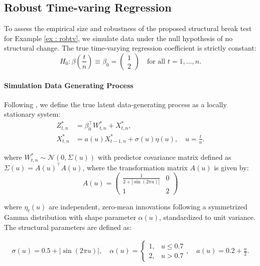 \documentclass[12pt,a4paper]{article}
\theoremstyle{definition}
\theoremstyle{definition}
\theoremstyle{theorem}
\begin{document}
\subsection{Robust Time-varing Regression}

To assess the empirical size and robustness of the proposed structural break test for Example \ref{ex : robtv}, we simulate data under the null hypothesis of no structural change. The true time-varying regression coefficient is strictly constant:
\begin{equation*}
    H_0: \beta\left(\frac{t}{n}\right) \equiv \beta_0 = \begin{pmatrix} 1 \\ 2 \end{pmatrix} \quad \text{for all } t = 1, \dots, n.
\end{equation*}

\paragraph{Simulation Data Generating Process}
Following \cite{Mies2023}, we define the true latent  data-generating process as a locally stationary system:
\begin{align}
    Z_{t,n}^* &= \beta_0^\top W_{t,n}^* + X_{t,n}^*, \\
    X_{t,n}^* &= a(u)X_{t-1,n}^* + \sigma(u) \eta(u),\quad u = \frac{t}{n}.\label{eq : AR(1)}
\end{align}


where $W_{t,n}^* \sim \mathcal{N}(0, \Sigma(u))$ with predictor covariance matrix defined as $\Sigma(u) = A(u)^\top A(u)$, where the transformation matrix $A(u)$ is given by:
\begin{equation*}
    A(u) = \begin{pmatrix} \frac{1}{2+|\sin(2\pi u)|} & 0 \\ 1 & 2 \end{pmatrix} 
\end{equation*}

where $\eta_t(u)$ are independent, zero-mean innovations following a symmetrized Gamma distribution with shape parameter $\alpha(u)$, standardized to unit variance. The structural parameters are defined as:

\begin{gather*}
    \sigma(u) = 0.5 + |\sin(2\pi u)|, \quad
    \alpha(u) = \begin{cases} 1, & u \le 0.7 \\ 2, & u > 0.7 \end{cases}, \quad
    a(u) = 0.2 + \frac{u}{2}.
\end{gather*}
\end{document}
